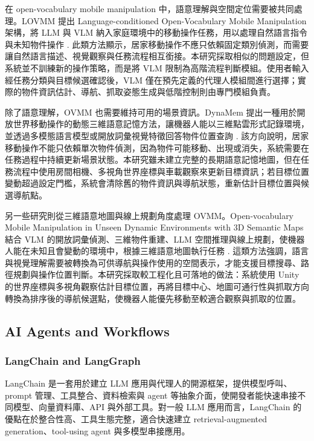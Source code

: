 \documentclass[12pt,a4paper]{article}
\begin{document}
在 open-vocabulary mobile manipulation 中，語意理解與空間定位需要被共同處理。LOVMM 提出 Language-conditioned Open-Vocabulary Mobile Manipulation 架構，將 LLM 與 VLM 納入家庭環境中的移動操作任務，用以處理自然語言指令與未知物件操作 \cite{tan2025lovmm}. 此類方法顯示，居家移動操作不應只依賴固定類別偵測，而需要讓自然語言描述、視覺觀察與任務流程相互銜接。本研究採取相似的問題設定，但系統並不訓練新的操作策略，而是將 VLM 限制為高階流程判斷模組。使用者輸入經任務分類與目標候選確認後，VLM 僅在預先定義的代理人模組間進行選擇；實際的物件資訊估計、導航、抓取姿態生成與低階控制則由專門模組負責。

除了語意理解，OVMM 也需要維持可用的場景資訊。DynaMem 提出一種用於開放世界移動操作的動態三維語意記憶方法，讓機器人能以三維點雲形式記錄環境，並透過多模態語言模型或開放詞彙視覺特徵回答物件位置查詢 \cite{liu2024dynamem}. 該方向說明，居家移動操作不能只依賴單次物件偵測，因為物件可能移動、出現或消失，系統需要在任務過程中持續更新場景狀態。本研究雖未建立完整的長期語意記憶地圖，但在任務流程中使用房間相機、多視角世界座標與車載觀察來更新目標資訊；若目標位置變動超過設定門檻，系統會清除舊的物件資訊與導航狀態，重新估計目標位置與候選導航點。

另一些研究則從三維語意地圖與線上規劃角度處理 OVMM。Open-vocabulary Mobile Manipulation in Unseen Dynamic Environments with 3D Semantic Maps 結合 VLM 的開放詞彙偵測、三維物件重建、LLM 空間推理與線上規劃，使機器人能在未知且會變動的環境中，根據三維語意地圖執行任務 \cite{qiu2024ovmm3dsemantic}. 這類方法強調，語言與視覺理解需要被轉換為可供導航與操作使用的空間表示，才能支援目標搜尋、路徑規劃與操作位置判斷。本研究採取較工程化且可落地的做法：系統使用 Unity 的世界座標與多視角觀察估計目標位置，再將目標中心、地圖可通行性與抓取方向轉換為排序後的導航候選點，使機器人能優先移動至較適合觀察與抓取的位置。

\subsection{AI Agents and Workflows}

\subsubsection{LangChain and LangGraph}

LangChain 是一套用於建立 LLM 應用與代理人的開源框架，提供模型呼叫、prompt 管理、工具整合、資料檢索與 agent 等抽象介面，使開發者能快速串接不同模型、向量資料庫、API 與外部工具。對一般 LLM 應用而言，LangChain 的優點在於整合性高、工具生態完整，適合快速建立 retrieval-augmented generation、tool-using agent 與多模型串接應用。
\end{document}
